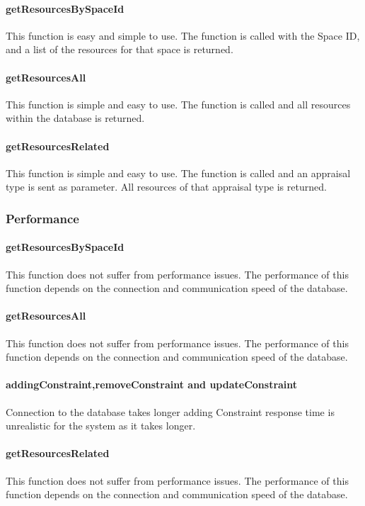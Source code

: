 \documentclass[a4paper]{article}
\begin{document}
\paragraph{getResourcesBySpaceId}
This function is easy and simple to use. The function is called with the Space ID, and a list of the resources for that space is returned.

\paragraph{getResourcesAll}
This function is simple and easy to use. The function is called and all resources within the database is returned.

\paragraph{getResourcesRelated}
This function is simple and easy to use. The function is called and an appraisal type is sent as parameter. All resources of that appraisal type is returned.

\subsubsection {Performance}

\paragraph{getResourcesBySpaceId}
This function does not suffer from performance issues. The performance of this function depends on the connection and communication speed of the database.

\paragraph{getResourcesAll}
This function does not suffer from performance issues. The performance of this function depends on the connection and communication speed of the database.

\paragraph{addingConstraint,removeConstraint and updateConstraint}
Connection to the database takes longer adding Constraint response time is unrealistic for the system as it takes longer.

\paragraph{getResourcesRelated}
This function does not suffer from performance issues. The performance of this function depends on the connection and communication speed of the database.
\end{document}

